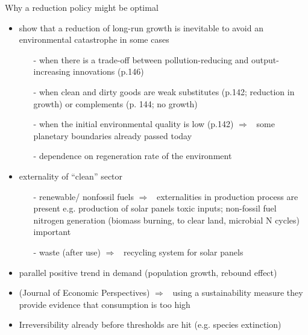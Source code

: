 \documentclass[11pt,aspectratio=169]{beamer}
\newcommand{\ar}{$\Rightarrow$ \ }
\begin{document}
\begin{frame}[allowframebreaks]{Why a reduction policy might be optimal}
\begin{itemize}
	\item \cite{Acemoglu2012TheChange} show that a reduction of long-run growth is inevitable to avoid an environmental catastrophe in some cases
	\begin{itemize}
\item[-] when there is a trade-off between pollution-reducing and output-increasing innovations (p.146)
\item[-] when clean and dirty goods are weak substitutes (p.142; reduction in growth)  or complements (p. 144; no growth)
\item[-] when the initial environmental quality is low (p.142) \ar some planetary boundaries already passed today \citep{Rockstrom2009AHumanity}
\item[-] dependence on regeneration rate of the environment
	\end{itemize}
\item externality of ``clean'' sector
\begin{itemize}
\item[-] renewable/ nonfossil fuels \ar externalities in production process are present e.g. production of solar panels toxic inputs; non-fossil fuel nitrogen generation (biomass burning, to clear land, microbial N cycles) important \citep{Song2021ImportantEmissions} 
\item[-] waste (after use) \ar recycling system for solar panels 
\end{itemize}
\item parallel positive trend in demand (population growth, rebound effect)
\item \cite{Arrow2004AreMuch}(Journal of Economic Perspectives) \ar using a sustainability measure they provide evidence that consumption is too high
\item Irreversibility already before thresholds are hit (e.g. species extinction)
\end{itemize}
\end{frame}
\end{document}
